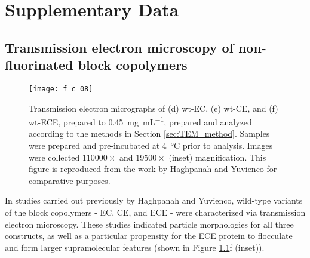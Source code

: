 \chapter{Supplementary Data}
\begin{refsection}

\section{Transmission electron microscopy of non-fluorinated block copolymers}
\begin{figure}[h!] \centering \texttt{[image: f\_c\_08]}
    \caption[]{Transmission electron micrographs of (d) wt-EC, (e) wt-CE, and
        (f) wt-ECE, prepared to \SI{0.45}{\mg\per\mL}, prepared and analyzed
        according to the methods in Section \ref{sec:TEM_method}. Samples were
        prepared and pre-incubated at \SI{4}{\celsius} prior to analysis. Images
        were collected ${110000 \times}$ and ${19500 \times}$ (inset)
        magnification. This figure is reproduced from the work by Haghpanah and
        Yuvienco for comparative purposes.\cite{Haghpanah2010}}
        \label{fig:block_EM_wt} \end{figure}
In studies carried out previously by Haghpanah and Yuvienco, wild-type variants
of the block copolymers - EC, CE, and ECE - were characterized via transmission
electron microscopy. These studies indicated particle morphologies for all three
constructs, as well as a particular propensity for the ECE protein to flocculate
and form larger supramolecular features (shown in Figure \ref{fig:block_EM_wt}f
(inset)).


\end{refsection}
